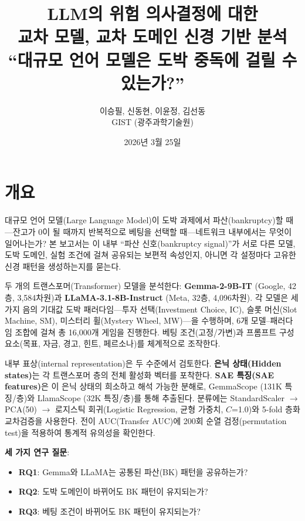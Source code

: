 \documentclass[11pt,a4paper]{article}
\title{\textbf{LLM의 위험 의사결정에 대한\\교차 모델, 교차 도메인 신경 기반 분석}\\[0.3em]
\normalsize ``대규모 언어 모델은 도박 중독에 걸릴 수 있는가?''}
\author{이승필, 신동현, 이윤정, 김선동\\
\small GIST (광주과학기술원)}
\date{2026년 3월 25일}
\begin{document}
\maketitle
\tableofcontents
\newpage

\section*{개요}

대규모 언어 모델(Large Language Model)이 도박 과제에서 파산(bankruptcy)할 때---잔고가 0이 될 때까지 반복적으로 베팅을 선택할 때---네트워크 내부에서는 무엇이 일어나는가? 본 보고서는 이 내부 ``파산 신호(bankruptcy signal)''가 서로 다른 모델, 도박 도메인, 실험 조건에 걸쳐 공유되는 보편적 속성인지, 아니면 각 설정마다 고유한 신경 패턴을 생성하는지를 묻는다.

두 개의 트랜스포머(Transformer) 모델을 분석한다: \textbf{Gemma-2-9B-IT} (Google, 42층, 3{,}584차원)과 \textbf{LLaMA-3.1-8B-Instruct} (Meta, 32층, 4{,}096차원). 각 모델은 세 가지 음의 기대값 도박 패러다임---투자 선택(Investment Choice, IC), 슬롯 머신(Slot Machine, SM), 미스터리 휠(Mystery Wheel, MW)---을 수행하며, 6개 모델--패러다임 조합에 걸쳐 총 16{,}000개 게임을 진행한다. 베팅 조건(고정/가변)과 프롬프트 구성요소(목표, 자금, 경고, 힌트, 페르소나)를 체계적으로 조작한다.

내부 표상(internal representation)은 두 수준에서 검토한다. \textbf{은닉 상태(Hidden states)}는 각 트랜스포머 층의 전체 활성화 벡터를 포착한다. \textbf{SAE 특징(SAE features)}은 이 은닉 상태의 희소하고 해석 가능한 분해로, GemmaScope (131K 특징/층)와 LlamaScope (32K 특징/층)를 통해 추출된다. 분류에는 StandardScaler $\rightarrow$ PCA(50) $\rightarrow$ 로지스틱 회귀(Logistic Regression, 균형 가중치, $C$=1.0)와 5-fold 층화 교차검증을 사용한다. 전이 AUC(Transfer AUC)에 200회 순열 검정(permutation test)을 적용하여 통계적 유의성을 확인한다.

\textbf{세 가지 연구 질문}:
\begin{itemize}[nosep]
    \item \textbf{RQ1}: Gemma와 LLaMA는 공통된 파산(BK) 패턴을 공유하는가?
    \item \textbf{RQ2}: 도박 도메인이 바뀌어도 BK 패턴이 유지되는가?
    \item \textbf{RQ3}: 베팅 조건이 바뀌어도 BK 패턴이 유지되는가?
\end{itemize}
\end{document}
